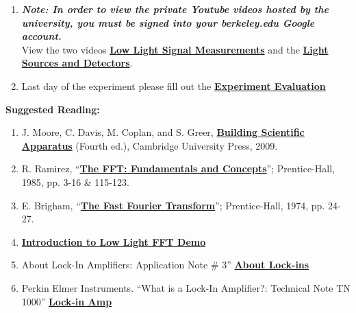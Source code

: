 \documentclass{../lab}
\begin{document}
\begin{enumerate}
    \item \emph{\textbf{Note: In order to view the private Youtube videos hosted by the university, you must be signed into your berkeley.edu Google account.}}\\
    View the two videos \href{http://youtu.be/X4XQ1jcMuoI}{\textbf{Low Light Signal Measurements}} and the \href{http://youtu.be/lQKLakISoBA}{\textbf{Light Sources and Detectors}}.

    \item Last day of the experiment please fill out the \href{\ExperimentEvaluation}{\textbf{Experiment Evaluation}}

\end{enumerate}

\noindent\textbf{Suggested Reading:}

\begin{enumerate}
    \item J. Moore, C. Davis, M. Coplan, and S. Greer, \href{https://drive.google.com/file/d/1RMHJY_8PrdhAJmcfJQySjcX1nUFYyLKk/view?usp=drive_link}{\textbf{Building Scientific Apparatus}} (Fourth ed.), Cambridge University Press, 2009.

    \item R. Ramirez, ``\href{https://drive.google.com/file/d/1ajsiFtRe8k86CYFSN72hqXV7qs8iwC-6/view?usp=drive_link}{\textbf{The FFT: Fundamentals and Concepts}}''; Prentice-Hall, 1985, pp. 3-16 \& 115-123.

    \item E. Brigham, ``\href{https://drive.google.com/file/d/1_XI5TG_B6UiyNqHtlNVsD0U5a_TcotgA/view?usp=drive_link}{\textbf{The Fast Fourier Transform}}''; Prentice-Hall, 1974, pp. 24-27.

    \item
    \href{https://drive.google.com/file/d/1Y0-Ax9kCPTmped5Op51245tUeRNKPRE4/view?usp=drive_link}{\textbf{Introduction to Low Light FFT Demo}}

    \item About Lock-In Amplifiers: Application Note \# 3” \href{https://drive.google.com/file/d/132FYfGLOt9ue8UWSOA31-Mgl27g-ZSIA/view?usp=drive_link}{\textbf{About Lock-ins}}

    \item Perkin Elmer Instruments. ``What is a Lock-In Amplifier?: Technical Note TN 1000'' \href{https://drive.google.com/file/d/1FmtwR5NzjuWKxHF-I4PpXlbl5YEwk3Pu/view?usp=drive_link}{\textbf{Lock-in Amp}}

\end{enumerate}
\end{document}
